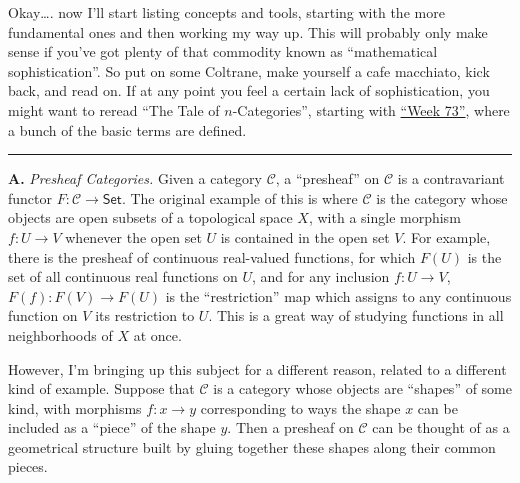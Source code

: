 \documentclass{article}
\begin{document}
Okay\ldots. now I'll start listing concepts and tools, starting with the
more fundamental ones and then working my way up. This will probably
only make sense if you've got plenty of that commodity known as
``mathematical sophistication''. So put on some Coltrane, make yourself
a cafe macchiato, kick back, and read on. If at any point you feel a
certain lack of sophistication, you might want to reread ``The Tale of
\(n\)-Categories'', starting with \protect\hyperlink{week73}{``Week
73''}, where a bunch of the basic terms are defined.

\begin{center}\rule{0.5\linewidth}{0.5pt}\end{center}

\textbf{A.} \emph{Presheaf Categories.} Given a category
\(\mathcal{C}\), a ``presheaf'' on \(\mathcal{C}\) is a contravariant
functor \(F\colon\mathcal{C}\to\mathsf{Set}\). The original example of
this is where \(\mathcal{C}\) is the category whose objects are open
subsets of a topological space \(X\), with a single morphism
\(f\colon U\to V\) whenever the open set \(U\) is contained in the open
set \(V\). For example, there is the presheaf of continuous real-valued
functions, for which \(F(U)\) is the set of all continuous real
functions on \(U\), and for any inclusion \(f\colon U\to V\),
\(F(f)\colon F(V)\to F(U)\) is the ``restriction'' map which assigns to
any continuous function on \(V\) its restriction to \(U\). This is a
great way of studying functions in all neighborhoods of \(X\) at once.

However, I'm bringing up this subject for a different reason, related to
a different kind of example. Suppose that \(\mathcal{C}\) is a category
whose objects are ``shapes'' of some kind, with morphisms
\(f\colon x\to y\) corresponding to ways the shape \(x\) can be included
as a ``piece'' of the shape \(y\). Then a presheaf on \(\mathcal{C}\)
can be thought of as a geometrical structure built by gluing together
these shapes along their common pieces.
\end{document}
